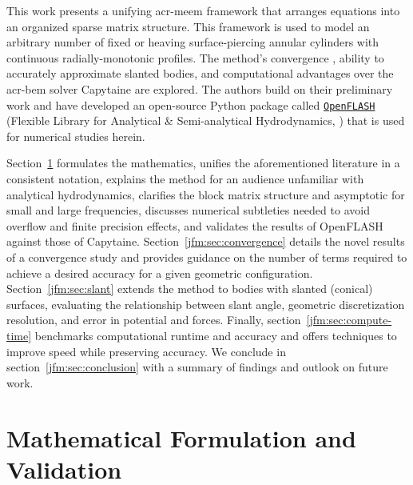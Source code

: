\documentclass[lineno]{JFM-FLM_Au}
\begin{document}
This work presents a unifying \gls{acr-meem} framework that arranges equations into an organized sparse matrix structure. 
This framework is used to model an arbitrary number of fixed or heaving surface-piercing annular cylinders with continuous radially-monotonic profiles. 
The method’s convergence \behaviour{}, ability to accurately approximate slanted bodies, and computational advantages over the \gls{acr-bem} solver Capytaine are explored. 
The authors build on their preliminary work \citep{mccabe_open-source_2024} and have developed an open-source Python package called \href{https://github.com/symbiotic-engineering/OpenFLASH}{\texttt{OpenFLASH}} (Flexible Library for Analytical \& Semi-analytical Hydrodynamics, \citep{best_openflash_2026,best_openflash-code_2026}) that is used for numerical studies herein.

Section~\ref{jfm:sec:mathematical-formulation} formulates the mathematics, unifies the aforementioned literature in a consistent notation, 
explains the method for an audience unfamiliar with analytical hydrodynamics, clarifies the block matrix structure and asymptotic \behaviour{} for small and large frequencies, discusses numerical subtleties needed to avoid overflow and finite precision effects, and validates the results of OpenFLASH against those of Capytaine.
Section~\ref{jfm:sec:convergence} details the novel results of a convergence study and provides guidance on the number of terms required to achieve a desired accuracy for a given geometric configuration.
Section~\ref{jfm:sec:slant} extends the method to bodies with slanted (conical) surfaces, evaluating the relationship between slant angle, geometric discretization resolution, and error in potential and forces. 
Finally, section~\ref{jfm:sec:compute-time} benchmarks computational runtime and accuracy and offers techniques to improve speed while preserving accuracy.
We conclude in section~\ref{jfm:sec:conclusion} with a summary of findings and outlook on future work.

\section{Mathematical Formulation and Validation}\label{jfm:sec:mathematical-formulation}
\end{document}
